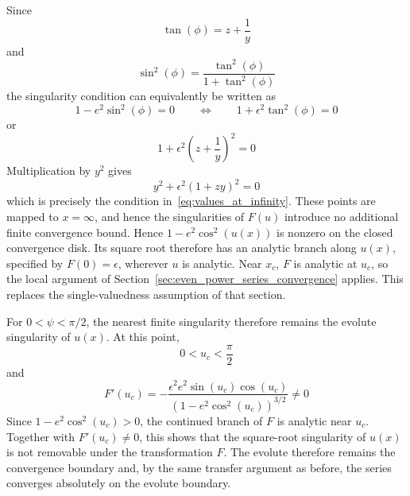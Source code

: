 \documentclass[a4paper]{amsart}
\begin{document}
Since
\begin{equation*}
\tan(\phi)=z+\frac1y
\end{equation*}
and
\begin{equation*}
\sin^2(\phi)
=
\frac{\tan^2(\phi)}{1+\tan^2(\phi)}
\end{equation*}
the singularity condition can equivalently be written as
\begin{equation*}
1-e^2\sin^2(\phi)=0
\qquad\Longleftrightarrow\qquad
1+\epsilon^2\tan^2(\phi)=0
\end{equation*}
or
\begin{equation*}
1+\epsilon^2\left(z+\frac1y\right)^2=0
\end{equation*}
Multiplication by $y^2$ gives
\begin{equation*}
y^2+\epsilon^2(1+zy)^2=0
\end{equation*}
which is precisely the condition in~\eqref{eq:values_at_infinity}. These points are mapped to $x=\infty$, and hence the singularities of $F(u)$ introduce no additional finite convergence bound.
%
Hence $1-e^2\cos^2(u(x))$ is nonzero on the closed convergence disk. Its square root therefore has an analytic branch along $u(x)$, specified by $F(0)=\epsilon$, wherever $u$ is analytic. Near $x_c$, $F$ is analytic at $u_c$, so the local argument of Section~\ref{sec:even_power_series_convergence} applies. This replaces the single-valuedness assumption of that section.

For $0<\psi<\pi/2$, the nearest finite singularity therefore remains the evolute singularity of $u(x)$. At this point,
\begin{equation*}
0<u_c<\frac{\pi}{2}
\end{equation*}
and
\begin{equation*}
F'(u_c)=-\frac{\epsilon^2e^2\sin(u_c)\cos(u_c)}
{\left(1-e^2\cos^2(u_c)\right)^{3/2}}
\neq 0
\end{equation*}
Since $1-e^2\cos^2(u_c)>0$, the continued branch of $F$ is analytic near $u_c$. Together with $F'(u_c)\neq 0$, this shows that the square-root singularity of $u(x)$ is not removable under the transformation $F$. The evolute therefore remains the convergence boundary and, by the same transfer argument as before, the series converges absolutely on the evolute boundary.
\end{document}
